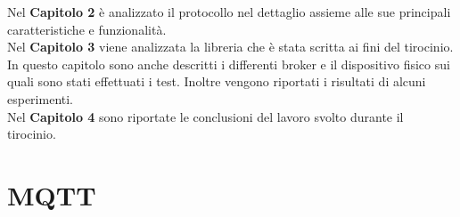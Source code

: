 \documentclass[binding=0.6cm,TFA]{sapthesis}
\begin{document}
\begin{large}
Nel \textbf{Capitolo 2} è analizzato il protocollo nel dettaglio assieme alle sue principali caratteristiche e funzionalità. \\

Nel \textbf{Capitolo 3} viene analizzata la libreria che è stata scritta ai fini del tirocinio. In questo capitolo sono anche descritti i differenti broker e il dispositivo fisico sui quali sono stati effettuati i test. Inoltre vengono riportati i risultati di alcuni esperimenti. \\

Nel \textbf{Capitolo 4} sono riportate le conclusioni del lavoro svolto durante il tirocinio.

\end{large}


\chapter{MQTT}
\end{document}
